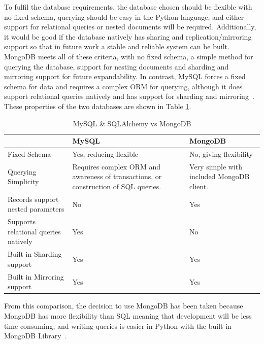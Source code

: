 \documentclass[authoryearcitations]{UoYCSproject}
\begin{document}
To fulfil the database requirements, the database chosen should be flexible with no fixed schema, querying should be easy in the Python language, and either support for relational queries or nested documents will be required. Additionally, it would be good if the database natively has sharing and replication/mirroring support so that in future work a stable and reliable system can be built. MongoDB meets all of these criteria, with no fixed schema, a simple method for querying the database, support for nesting documents and sharding and mirroring support for future expandability. In contrast, MySQL forces a fixed schema for data and requires a complex ORM for querying, although it does support relational queries natively and has support for sharding and mirroring~\cite{mySqlShardingReplication}. These properties of the two databases are shown in Table \ref{table:mysqlVsMongo}.

\begin{table}
\begin{center}
    \begin{tabular}{| p{4.0cm} | p{4.5cm} | p{4.0cm} |}
    \hline
     & MySQL & MongoDB \\ \hline
    Fixed Schema & Yes, reducing flexible & No, giving flexibility \\ \hline
    Querying Simplicity & Requires complex ORM and awareness of transactions, or construction of SQL queries. & Very simple with included MongoDB client. \\ \hline
    Records support nested parameters & No & Yes \\ \hline
    Supports relational queries natively & Yes & No \\ \hline
    Built in Sharding support & Yes & Yes \\ \hline
    Built in Mirroring support & Yes & Yes \\ \hline
    \end{tabular}
    \caption{MySQL \& SQLAlchemy vs MongoDB}
    \label{table:mysqlVsMongo}
\end{center}
\end{table}

From this comparison, the decision to use MongoDB has been taken because MongoDB has more flexibility than SQL meaning that development will be less time consuming, and writing queries is easier in Python with the built-in MongoDB Library~\cite{libraryPyMongo}.
\end{document}
